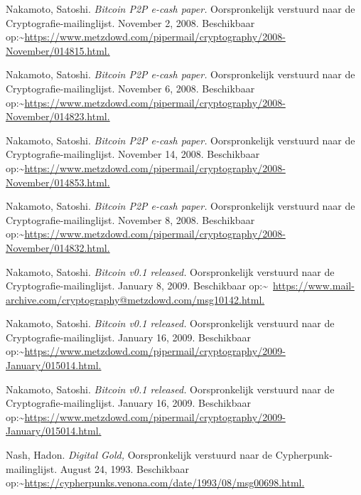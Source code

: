 \documentclass[smalldemyvopaper,11pt,twoside,onecolumn,openright,extrafontsizes,hidelinks]{memoir}
\begin{document}
Nakamoto, Satoshi. \emph{Bitcoin P2P e-cash paper.} Oorspronkelijk
verstuurd naar de Cryptografie-mailinglijst. November 2, 2008.
Beschikbaar
op:\textasciitilde{}\href{https://www.metzdowd.com/pipermail/cryptography/2008-November/014815.html}{https://www.metzdowd.com/pipermail/cryptography/2008-November/014815.html.}

Nakamoto, Satoshi. \emph{Bitcoin P2P e-cash paper.} Oorspronkelijk
verstuurd naar de Cryptografie-mailinglijst. November 6, 2008.
Beschikbaar
op:\textasciitilde{}\href{https://www.metzdowd.com/pipermail/cryptography/2008-November/014823.html}{https://www.metzdowd.com/pipermail/cryptography/2008-November/014823.html.}

Nakamoto, Satoshi. \emph{Bitcoin P2P e-cash paper.} Oorspronkelijk
verstuurd naar de Cryptografie-mailinglijst. November 14, 2008.
Beschikbaar
op:\textasciitilde{}\href{https://www.metzdowd.com/pipermail/cryptography/2008-November/014853.html}{https://www.metzdowd.com/pipermail/cryptography/2008-November/014853.html.}

Nakamoto, Satoshi. \emph{Bitcoin P2P e-cash paper.} Oorspronkelijk
verstuurd naar de Cryptografie-mailinglijst. November 8, 2008.
Beschikbaar
op:\textasciitilde{}\href{https://www.metzdowd.com/pipermail/cryptography/2008-November/014832.html}{https://www.metzdowd.com/pipermail/cryptography/2008-November/014832.html.}

Nakamoto, Satoshi. \emph{Bitcoin v0.1 released.} Oorspronkelijk
verstuurd naar de Cryptografie-mailinglijst. January 8, 2009.
Beschikbaar
op:\textasciitilde~\href{https://www.mail-archive.com/cryptography@metzdowd.com/msg10142.html}{https://www.mail-archive.com/cryptography@metzdowd.com/msg10142.html.}

Nakamoto, Satoshi. \emph{Bitcoin v0.1 released.} Oorspronkelijk
verstuurd naar de Cryptografie-mailinglijst. January 16, 2009.
Beschikbaar
op:\textasciitilde{}\href{https://www.metzdowd.com/pipermail/cryptography/2009-January/015014.html}{https://www.metzdowd.com/pipermail/cryptography/2009-January/015014.html.}

Nakamoto, Satoshi. \emph{Bitcoin v0.1 released.} Oorspronkelijk
verstuurd naar de Cryptografie-mailinglijst. January 16, 2009.
Beschikbaar
op:\textasciitilde{}\href{https://www.metzdowd.com/pipermail/cryptography/2009-January/015014.html}{https://www.metzdowd.com/pipermail/cryptography/2009-January/015014.html.}

Nash, Hadon. \emph{Digital Gold,} Oorspronkelijk verstuurd naar de
Cypherpunk-mailinglijst. August 24, 1993. Beschikbaar
op:\textasciitilde{}\href{https://cypherpunks.venona.com/date/1993/08/msg00698.html}{https://cypherpunks.venona.com/date/1993/08/msg00698.html.}
\end{document}
